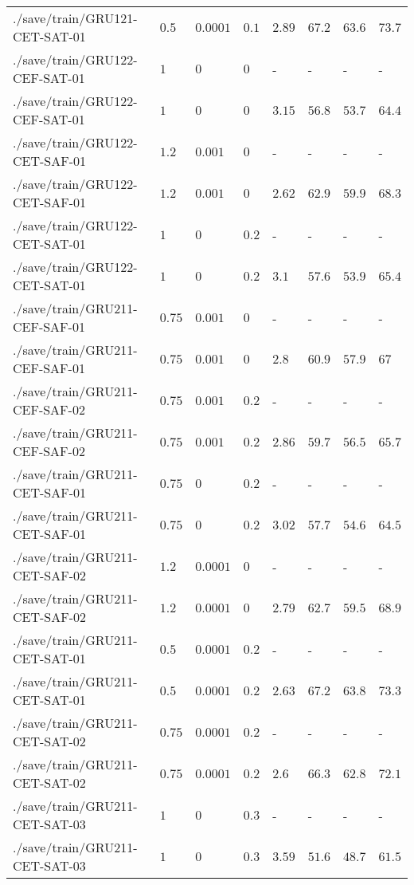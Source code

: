 \begin{table}[tbp]
\begin{tabular}{llllllll}
./save/train/GRU121-CET-SAT-01 & $0.5$ & $0.0001$ & $0.1$ & $2.89$ & $67.2$ & $63.6$ & $73.7$ \\
./save/train/GRU122-CEF-SAT-01 & $1$ & $0$ & $0$ & - & - & - & - \\
./save/train/GRU122-CEF-SAT-01 & $1$ & $0$ & $0$ & $3.15$ & $56.8$ & $53.7$ & $64.4$ \\
./save/train/GRU122-CET-SAF-01 & $1.2$ & $0.001$ & $0$ & - & - & - & - \\
./save/train/GRU122-CET-SAF-01 & $1.2$ & $0.001$ & $0$ & $2.62$ & $62.9$ & $59.9$ & $68.3$ \\
./save/train/GRU122-CET-SAT-01 & $1$ & $0$ & $0.2$ & - & - & - & - \\
./save/train/GRU122-CET-SAT-01 & $1$ & $0$ & $0.2$ & $3.1$ & $57.6$ & $53.9$ & $65.4$ \\
./save/train/GRU211-CEF-SAF-01 & $0.75$ & $0.001$ & $0$ & - & - & - & - \\
./save/train/GRU211-CEF-SAF-01 & $0.75$ & $0.001$ & $0$ & $2.8$ & $60.9$ & $57.9$ & $67$ \\
./save/train/GRU211-CEF-SAF-02 & $0.75$ & $0.001$ & $0.2$ & - & - & - & - \\
./save/train/GRU211-CEF-SAF-02 & $0.75$ & $0.001$ & $0.2$ & $2.86$ & $59.7$ & $56.5$ & $65.7$ \\
./save/train/GRU211-CET-SAF-01 & $0.75$ & $0$ & $0.2$ & - & - & - & - \\
./save/train/GRU211-CET-SAF-01 & $0.75$ & $0$ & $0.2$ & $3.02$ & $57.7$ & $54.6$ & $64.5$ \\
./save/train/GRU211-CET-SAF-02 & $1.2$ & $0.0001$ & $0$ & - & - & - & - \\
./save/train/GRU211-CET-SAF-02 & $1.2$ & $0.0001$ & $0$ & $2.79$ & $62.7$ & $59.5$ & $68.9$ \\
./save/train/GRU211-CET-SAT-01 & $0.5$ & $0.0001$ & $0.2$ & - & - & - & - \\
./save/train/GRU211-CET-SAT-01 & $0.5$ & $0.0001$ & $0.2$ & $2.63$ & $67.2$ & $63.8$ & $73.3$ \\
./save/train/GRU211-CET-SAT-02 & $0.75$ & $0.0001$ & $0.2$ & - & - & - & - \\
./save/train/GRU211-CET-SAT-02 & $0.75$ & $0.0001$ & $0.2$ & $2.6$ & $66.3$ & $62.8$ & $72.1$ \\
./save/train/GRU211-CET-SAT-03 & $1$ & $0$ & $0.3$ & - & - & - & - \\
./save/train/GRU211-CET-SAT-03 & $1$ & $0$ & $0.3$ & $3.59$ & $51.6$ & $48.7$ & $61.5$ \\

\end{tabular}
\end{table}
